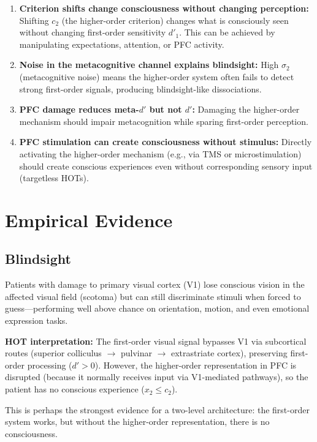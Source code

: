 \documentclass[11pt,a4paper]{report}
\begin{document}
\begin{predbox}
\begin{enumerate}[leftmargin=1.5em]
  \item \textbf{Criterion shifts change consciousness without changing perception:} Shifting $c_2$ (the higher-order criterion) changes what is consciously seen without changing first-order sensitivity $d'_1$. This can be achieved by manipulating expectations, attention, or PFC activity.
  \item \textbf{Noise in the metacognitive channel explains blindsight:} High $\sigma_2$ (metacognitive noise) means the higher-order system often fails to detect strong first-order signals, producing blindsight-like dissociations.
  \item \textbf{PFC damage reduces meta-$d'$ but not $d'$:} Damaging the higher-order mechanism should impair metacognition while sparing first-order perception.
  \item \textbf{PFC stimulation can create consciousness without stimulus:} Directly activating the higher-order mechanism (e.g., via TMS or microstimulation) should create conscious experiences even without corresponding sensory input (targetless HOTs).
\end{enumerate}
\end{predbox}


\chapter{Empirical Evidence}

\section{Blindsight}

\begin{examplebox}
Patients with damage to primary visual cortex (V1) lose conscious vision in the affected visual field (scotoma) but can still discriminate stimuli when forced to guess---performing well above chance on orientation, motion, and even emotional expression tasks.

\textbf{HOT interpretation:} The first-order visual signal bypasses V1 via subcortical routes (superior colliculus $\to$ pulvinar $\to$ extrastriate cortex), preserving first-order processing ($d' > 0$). However, the higher-order representation in PFC is disrupted (because it normally receives input via V1-mediated pathways), so the patient has no conscious experience ($x_2 \leq c_2$).

This is perhaps the strongest evidence for a two-level architecture: the first-order system works, but without the higher-order representation, there is no consciousness.
\end{examplebox}
\end{document}
